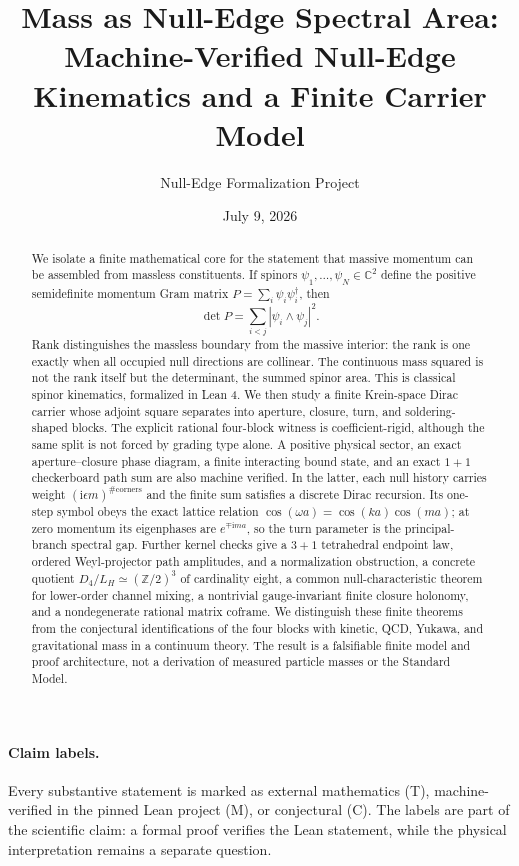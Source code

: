 \documentclass[11pt]{article}
\title{Mass as Null-Edge Spectral Area:\\
Machine-Verified Null-Edge Kinematics and a Finite Carrier Model}
\author{Null-Edge Formalization Project}
\date{July 9, 2026}
\newcommand{\Mtag}{\textcolor{verified}{\textsc{M}}}
\newcommand{\Ttag}{\textcolor{external}{\textsc{T}}}
\newcommand{\Ctag}{\textcolor{conjectural}{\textsc{C}}}
\newcommand{\ii}{\mathrm{i}}
\newcommand{\Z}{\mathbb{Z}}
\newcommand{\C}{\mathbb{C}}
\begin{document}
\maketitle

\begin{abstract}
We isolate a finite mathematical core for the statement that massive momentum
can be assembled from massless constituents.  If spinors
$\psi_1,\ldots,\psi_N\in\C^2$ define the positive semidefinite momentum Gram
matrix $P=\sum_i\psi_i\psi_i^\dagger$, then
\[
  \det P=\sum_{i<j}|\psi_i\wedge\psi_j|^2.
\]
Rank distinguishes the massless boundary from the massive interior: the rank
is one exactly when all occupied null directions are collinear.  The continuous
mass squared is not the rank itself but the determinant, the summed spinor area.
This is classical spinor kinematics, formalized in Lean 4.  We then study a
finite Krein-space Dirac carrier whose adjoint square
separates into aperture, closure, turn, and soldering-shaped blocks.  The
explicit rational four-block witness is coefficient-rigid, although the same
split is not forced by grading type alone.  A positive physical sector, an
  exact aperture--closure phase diagram, a finite interacting bound state, and
  an exact $1+1$ checkerboard path sum are also machine verified.  In the latter,
  each null history carries weight $(\ii\epsilon m)^{\#\text{corners}}$ and the
  finite sum satisfies a discrete Dirac recursion.  Its one-step symbol obeys
  the exact lattice relation $\cos(\omega a)=\cos(ka)\cos(ma)$; at zero momentum
  its eigenphases are $e^{\mp\ii ma}$, so the turn parameter is the
  principal-branch spectral gap.  Further kernel checks give a
  $3+1$ tetrahedral endpoint law, ordered Weyl-projector path amplitudes, and a
  normalization obstruction,
  a concrete quotient $D_4/L_H\simeq(\Z/2)^3$ of cardinality eight,
  a common null-characteristic theorem for lower-order channel mixing, a
nontrivial gauge-invariant finite closure holonomy, and a nondegenerate
rational matrix coframe.  We distinguish these finite
theorems from the conjectural identifications of the four blocks with kinetic,
QCD, Yukawa, and gravitational mass in a continuum theory.  The result is a
falsifiable finite model and proof architecture, not a derivation of measured
particle masses or the Standard Model.
\end{abstract}

\paragraph{Claim labels.}
Every substantive statement is marked as external mathematics (\Ttag),
machine-verified in the pinned Lean project (\Mtag), or conjectural (\Ctag).
The labels are part of the scientific claim: a formal proof verifies the Lean
statement, while the physical interpretation remains a separate question.
\end{document}
